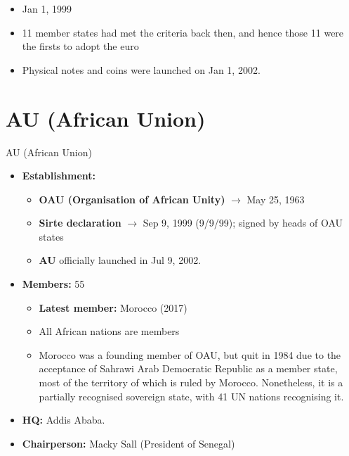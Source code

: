 \documentclass[
  12pt,
  ignorenonframetext,
  progressbar=frametitle]{beamer}
\providecommand{\tightlist}{%
  \setlength{\itemsep}{0pt}\setlength{\parskip}{0pt}}
\begin{document}
\begin{frame}[allowframebreaks]
\begin{itemize}
\begin{itemize}
    \begin{itemize}
    \tightlist
    \item
      Jan 1, 1999
    \item
      11 member states had met the criteria back then, and hence those
      11 were the firsts to adopt the euro
    \item
      Physical notes and coins were launched on Jan 1, 2002.
    \end{itemize}
  \end{itemize}
\end{itemize}
\end{frame}

\section{AU (African Union)}
\begin{frame}[allowframebreaks]
{AU (African Union)}
\protect\hypertarget{au-african-union}{}
\begin{itemize}
\tightlist
\item
  \textbf{Establishment:}

  \begin{itemize}
  \tightlist
  \item
    \textbf{OAU (Organisation of African Unity)} \(\rightarrow\) May 25,
    1963
  \item
    \textbf{Sirte declaration} \(\rightarrow\) Sep 9, 1999 (9/9/99);
    signed by heads of OAU states
  \item
    \textbf{AU} officially launched in Jul 9, 2002.
  \end{itemize}
\item
  \textbf{Members:} 55

  \begin{itemize}
  \tightlist
  \item
    \textbf{Latest member:} Morocco (2017)
  \item
    All African nations are members
  \item
    Morocco was a founding member of OAU, but quit in 1984 due to the
    acceptance of Sahrawi Arab Democratic Republic as a member state,
    most of the territory of which is ruled by Morocco. Nonetheless, it
    is a partially recognised sovereign state, with 41 UN nations
    recognising it.
  \end{itemize}
\item
  \textbf{HQ:} Addis Ababa.
\item
  \textbf{Chairperson:} Macky Sall (President of Senegal)
\end{itemize}
\end{frame}
\end{document}
